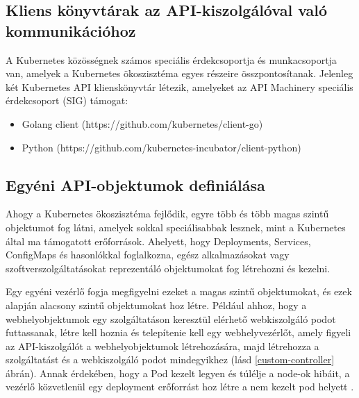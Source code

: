 \subsection{Kliens könyvtárak az API-kiszolgálóval való kommunikációhoz}
A Kubernetes közösségnek számos speciális érdekcsoportja és munkacsoportja van, amelyek a Kubernetes ökoszisztéma egyes részeire összpontosítanak.
Jelenleg két Kubernetes API klienskönyvtár létezik, amelyeket az API Machinery speciális érdekcsoport (SIG) támogat: \cite{Marko17}

\begin{itemize}
    \item Golang client (https://github.com/kubernetes/client-go)
    \item Python (https://github.com/kubernetes-incubator/client-python)
\end{itemize}

\subsection{Egyéni API-objektumok definiálása}
Ahogy a Kubernetes ökoszisztéma fejlődik, egyre több és több magas szintű objektumot fog látni, amelyek sokkal speciálisabbak lesznek, mint a Kubernetes által ma támogatott erőforrások.
Ahelyett, hogy Deployments, Services, ConfigMaps és hasonlókkal foglalkozna, egész alkalmazásokat vagy szoftverszolgáltatásokat reprezentáló objektumokat fog létrehozni és kezelni.

Egy egyéni vezérlő fogja megfigyelni ezeket a magas szintű objektumokat, és ezek alapján alacsony szintű objektumokat hoz létre.
Például ahhoz, hogy a webhelyobjektumok egy szolgáltatáson keresztül elérhető webkiszolgáló podot futtassanak, létre kell hoznia és telepítenie kell egy webhelyvezérlőt, amely figyeli az API-kiszolgálót a webhelyobjektumok létrehozására, majd létrehozza a szolgáltatást és a webkiszolgáló podot mindegyikhez (lásd \ref{custom-controller} ábrán).
Annak érdekében, hogy a Pod kezelt legyen és túlélje a node-ok hibáit, a vezérlő közvetlenül egy deployment erőforrást hoz létre a nem kezelt pod helyett \cite{Marko17}.

